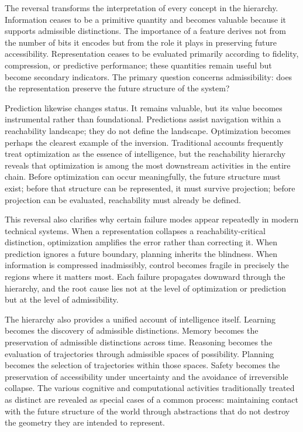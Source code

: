 \documentclass[12pt,a4paper]{article}
\theoremstyle{plain}
\theoremstyle{definition}
\theoremstyle{remark}
\begin{document}
The reversal transforms the interpretation of every concept in the hierarchy.
Information ceases to be a primitive quantity and becomes valuable because
it supports admissible distinctions. The importance of a feature derives not
from the number of bits it encodes but from the role it plays in preserving
future accessibility. Representation ceases to be evaluated primarily
according to fidelity, compression, or predictive performance; these
quantities remain useful but become secondary indicators. The primary
question concerns admissibility: does the representation preserve the future
structure of the system?

Prediction likewise changes status. It remains valuable, but its value
becomes instrumental rather than foundational. Predictions assist navigation
within a reachability landscape; they do not define the landscape.
Optimization becomes perhaps the clearest example of the inversion.
Traditional accounts frequently treat optimization as the essence of
intelligence, but the reachability hierarchy reveals that optimization is
among the most downstream activities in the entire chain. Before optimization
can occur meaningfully, the future structure must exist; before that
structure can be represented, it must survive projection; before projection
can be evaluated, reachability must already be defined.

This reversal also clarifies why certain failure modes appear repeatedly in
modern technical systems. When a representation collapses a
reachability-critical distinction, optimization amplifies the error rather
than correcting it. When prediction ignores a future boundary, planning
inherits the blindness. When information is compressed inadmissibly, control
becomes fragile in precisely the regions where it matters most. Each failure
propagates downward through the hierarchy, and the root cause lies not at the
level of optimization or prediction but at the level of admissibility.

The hierarchy also provides a unified account of intelligence itself.
Learning becomes the discovery of admissible distinctions. Memory becomes
the preservation of admissible distinctions across time. Reasoning becomes
the evaluation of trajectories through admissible spaces of possibility.
Planning becomes the selection of trajectories within those spaces. Safety
becomes the preservation of accessibility under uncertainty and the avoidance
of irreversible collapse. The various cognitive and computational activities
traditionally treated as distinct are revealed as special cases of a common
process: maintaining contact with the future structure of the world through
abstractions that do not destroy the geometry they are intended to represent.
\end{document}
